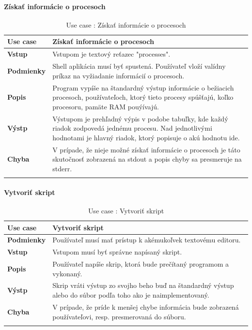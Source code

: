 \paragraph{Získať informácie o procesoch}
\begin{center}
	\begin{longtable}{|p{2.5cm}|p{14cm}|}
		
			\hline
			\textbf{Use case} & Získať informácie o procesoch \\ 
			\hline
			\textbf{Vstup} & Vstupom je textový reťazec "processes".\\
			\hline
			\textbf{Podmienky} & Shell aplikácia musí byť spustená. Používateľ vloží valídny príkaz na vyžiadanie informácií o procesoch. \\ 
			\hline

			\textbf{Popis} & Program vypíše na štandardný výstup informácie o bežiacich procesoch, používateľoch, ktorý tieto procesy spúšťajú, koľko procesoru, pamäte RAM pouýívajú.\\ 
			\hline

			\textbf{Výstp} & Výstupom je prehľadný výpis v podobe tabuľky, kde každý riadok zodpovedá jednému procesu. Nad jednotlivými hodnotami je hlavný riadok, ktorý popisuje o akú hodnotu ide.\\
			\hline
			\textbf{Chyba} & V prípade, že nieje možné získať informácie o procesoch je táto skutočnosť zobrazená na stdout a popis chyby sa presmeruje na stderr.\\
			\hline
		\caption{Use case : Získať informácie o procesoch}
		\label{table:1}
		
	\end{longtable}
\end{center}
\paragraph{Vytvoriť skript}
\begin{center}
	\begin{longtable}{|p{2.5cm}|p{14cm}|}
		
			\hline
			\textbf{Use case} & Vytvoriť skript \\ 
			\hline
			\textbf{Podmienky} & Používateľ musí mať prístup k akémukoľvek textovému editoru.  \\ 
			\hline
			\textbf{Vstup} & Vstupom musí byť správne napísaný skript. \\
			\hline
			\textbf{Popis} & Používateľ napíše skrip, ktorá bude prečítaný programom a vykonaný.\\ 
			\hline
			\textbf{Výstp} & Skrip vráti výstup zo svojho beho buď na štandardný výstup alebo do súbor podľa toho ako je naimplementovaný.\\
			\hline
			\textbf{Chyba} & V prípade, že príde k menšej chybe informácia bude zobrazená používateľovi, resp. presmerovaná do súboru.\\
			\hline
		\caption{Use case : Vytvoriť skript}
		\label{table:1}
		
	\end{longtable}
\end{center}
